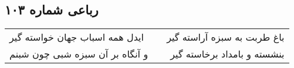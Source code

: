\begin{center}
\section*{رباعی شماره ۱۰۳}
\label{sec:sh103}
\begin{longtable}{l p{0.5cm} r}
ایدل همه اسباب جهان خواسته گیر
&&
باغ طربت به سبزه آراسته گیر
\\
و آنگاه بر آن سبزه شبی چون شبنم
&&
بنشسته و بامداد برخاسته گیر
\\
\end{longtable}
\end{center}
